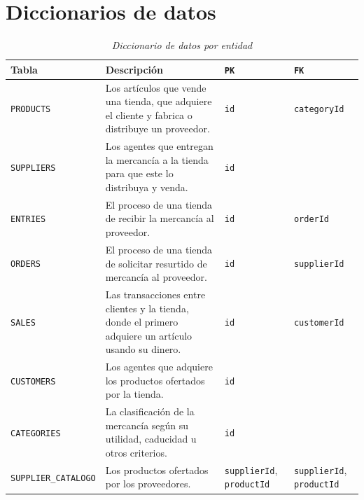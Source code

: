 \documentclass[11pt]{article}
\begin{document}
\section*{\centering Diccionarios de datos}
\vspace{0.5cm}
\begin{table}[h!]
\centering
\caption{\textit{Diccionario de datos por entidad}}
\label{tab:diccionario-entidad}
\begin{tabular}{
    | p{3.3cm}
    | p{5.2cm}
    | p{2.8cm}
    | p{2.8cm} |
}
	\toprule
	\textbf{Tabla} & \textbf{Descripción} & \textbf{\texttt{PK}} & \textbf{\texttt{FK}} \\
    \midrule
    \texttt{PRODUCTS}            & Los artículos que vende una tienda, que adquiere el cliente y fabrica o distribuye un proveedor.      & \texttt{id}                               & \texttt{categoryId} \\
    \midrule
    \texttt{SUPPLIERS}           & Los agentes que entregan la mercancía a la tienda para que este lo distribuya y venda.                & \texttt{id}                               & \\
    \midrule
    \texttt{ENTRIES}             & El proceso de una tienda de recibir la mercancía al proveedor.                                        & \texttt{id}                               & \texttt{orderId} \\
    \midrule
    \texttt{ORDERS}              & El proceso de una tienda de solicitar resurtido de mercancía al proveedor.                            & \texttt{id}                               & \texttt{supplierId} \\
    \midrule
    \texttt{SALES}               & Las transacciones entre clientes y la tienda, donde el primero adquiere un artículo usando su dinero. & \texttt{id}                               & \texttt{customerId} \\
    \midrule
    \texttt{CUSTOMERS}           & Los agentes que adquiere los productos ofertados por la tienda.                                       & \texttt{id}                               & \\
    \midrule
    \texttt{CATEGORIES}          & La clasificación de la mercancía según su utilidad, caducidad u otros criterios.                      & \texttt{id}                               & \\
    \midrule
    \texttt{SUPPLIER\_CATALOGO}  & Los productos ofertados por los proveedores.                                                          & \texttt{supplierId}, \texttt{productId}   & \texttt{supplierId}, \texttt{productId} \\

\end{tabular}
\end{table}
\end{document}

